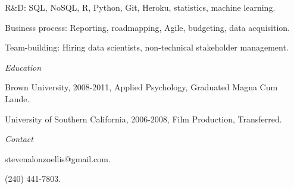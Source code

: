 \documentclass[12pt]{res}
\begin{document}
{\begin{resume}
\begin{list}{}{\leftmargin=1em}
{\item
\begin{list}{-}{\leftmargin=1em}
\item R\&D: SQL, NoSQL, R, Python, Git, Heroku, statistics, machine learning. 
\item Business process: Reporting, roadmapping, Agile, budgeting, data acquisition. 
\item Team-building: Hiring data scientists, non-technical stakeholder management.
\end{list}}
\item
\item{\centering \textit{Education}
\item 
\item
\begin{list}{-}{\leftmargin=1em}
\item Brown University, 2008-2011, Applied Psychology, Graduated Magna Cum Laude. 
\item University of Southern California, 2006-2008, Film Production, Transferred. 
\end{list}}
\item
\item{\centering \textit{Contact}
\item 
\item
\begin{list}{-}{\leftmargin=1em}
\item stevenalonzoellis@gmail.com.
\item (240) 441-7803.
\end{list}}
\item
\end{list}
\end{resume}
} %
\end{document}
